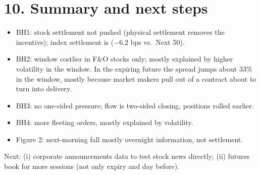 \documentclass[11pt]{article}
\begin{document}
\section*{10. Summary and next steps}
\begin{itemize}
  \item BH1: stock settlement not pushed (physical settlement removes the incentive); index
  settlement is ($-6.2$ bps vs.\ Next 50).
  \item BH2: window costlier in F\&O stocks only; mostly explained by higher volatility in
  the window. In the expiring future the spread jumps about 33\% in the window, mostly because
  market makers pull out of a contract about to turn into delivery.
  \item BH3: no one-sided pressure; flow is two-sided closing, positions rolled earlier.
  \item BH4: more fleeting orders, mostly explained by volatility.
  \item Figure 2: next-morning fall mostly overnight information, not settlement.
\end{itemize}
Next: (i) corporate announcements data to test stock news directly; (ii) futures book for more
sessions (not only expiry and day before).
\end{document}
